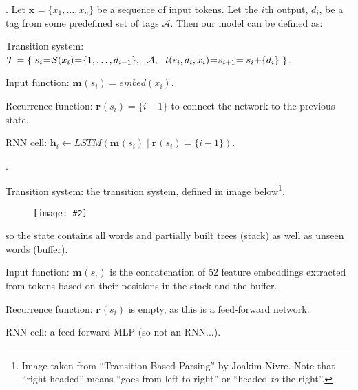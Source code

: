 \documentclass[11pt]{article}
\renewcommand\vec[2][]{\bm{#2}_{#1}}
\newcommand\myfig[2][0.3\textwidth]{\begin{figure}[h!]\centering\texttt{[image: \#2]}\end{figure}}
\newcommand\myspace[1][]{\vspace{#1\bigskipamount}}
\newcommand\p{\Needspace{10\baselineskip} \noindent}
\begin{document}
\myspace
\p {}. Let $\vec{x} = \{ x_1, \ldots, x_n \}$ be a sequence of input tokens. Let the $i$th output, $d_i$, be a tag from some predefined set of tags $\mathcal{A}$. Then our model can be defined as:
\begin{compactitem}
	\item Transition system: $\mathcal{T} = \{~  s_i\hspace{-0.5ex}=\hspace{-0.5ex}\mathcal{S}(x_i)\hspace{-0.5ex}=\hspace{-0.5ex}\{1,\ldots,d_{i-1} \}, ~~ \mathcal{A}, ~~ t(s_i, d_i, x_i)\hspace{-0.5ex}=\hspace{-0.5ex}s_{i+1}\hspace{-0.5ex}=s_i\hspace{-0.5ex}+\hspace{-0.5ex}\{d_i\}  ~ \}$. 
	\item Input function:  $\vec{m}(s_i) = embed(x_i)$.
	\item Recurrence function: $\vec{r}(s_i) = \{i - 1\}$ to connect the network to the previous state. 
	\item RNN cell: $\vec[i]{h} \leftarrow LSTM(\vec{m}(s_i) \mid \vec{r}(s_i)=\{i-1\}  )$. 
\end{compactitem}

\myspace
\p {}. 
\begin{compactitem}
	\item Transition system: the  transition system, defined in image below\footnote{Image taken from ``Transition-Based Parsing'' by Joakim Nivre. Note that ``right-headed'' means ``goes from left to right'' or ``headed \textit{to} the right''.}. 
		\myfig[0.6\textwidth]{figs/arc_standard_alg.png}
		
		so the state contains all words and partially built trees (stack) as well as unseen words (buffer). 
		
	\item Input function: $\vec{m}(s_i)$ is the concatenation of 52 feature embeddings extracted from tokens based on their positions in the stack and the buffer.
	\item Recurrence function: $\vec{r}(s_i)$ is empty, as this is a feed-forward network. 
	\item RNN cell: a feed-forward MLP (so not an RNN...). 
\end{compactitem}
\end{document}
